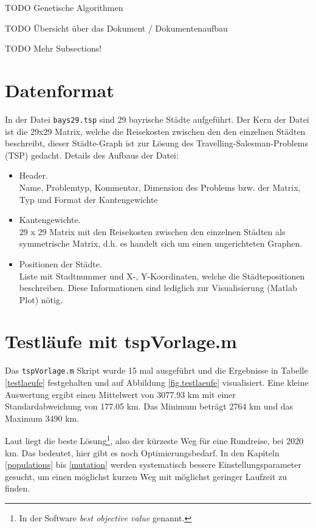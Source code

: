 TODO Genetische Algorithmen

TODO Übersicht über das Dokument / Dokumentenaufbau

TODO Mehr Subsections!


\section{Datenformat}

\noindent In der Datei {\tt bays29.tsp} sind 29 bayrische Städte aufgeführt.
Der Kern der Datei ist die 29x29 Matrix, welche die Reisekosten zwischen
den den einzelnen Städten beschreibt, dieser Städte-Graph ist zur Lösung
des Travelling-Salesman-Problems (TSP) gedacht.
Details des Aufbaus der Datei:

\begin{itemize}
  \item Header.\\
  Name, Problemtyp, Kommentar, Dimension des Problems bzw. der Matrix, Typ und Format der Kantengewichte
  \item Kantengewichte.\\
  29 x 29 Matrix mit den Reisekosten zwischen den einzelnen Städten als symmetrische Matrix, d.h. es handelt sich um einen ungerichteten Graphen.
  \item Positionen der Städte.\\
  Liste mit Stadtnummer und X-, Y-Koordinaten, welche die Städtepositionen beschreiben.
  Diese Informationen sind lediglich zur Visualisierung (Matlab Plot) nötig.
\end{itemize}


\section{Testläufe mit tspVorlage.m}

Das {\tt tspVorlage.m} Skript wurde 15 mal ausgeführt und die Ergebnisse in
Tabelle \ref{testlaeufe} festgehalten und auf Abbildung \ref{fig.testlaeufe}
visualisiert.
Eine kleine Auswertung ergibt einen Mittelwert von 3077.93 km mit
einer Standardabweichung von 177.05 km.
Das Minimum beträgt 2764 km und das Maximum 3490 km.

Laut \cite{aufg} liegt die beste
Lösung\footnote{In der Software \emph{best objective value} genannt.},
also der kürzeste Weg für eine Rundreise, bei 2020 km.
Das bedeutet, hier gibt es noch Optimierungsbedarf.
In den Kapiteln \ref{populations} bis \ref{mutation} werden systematisch bessere Einstellungsparameter
gesucht, um einen möglichst kurzen Weg mit möglichst geringer Laufzeit zu finden.

